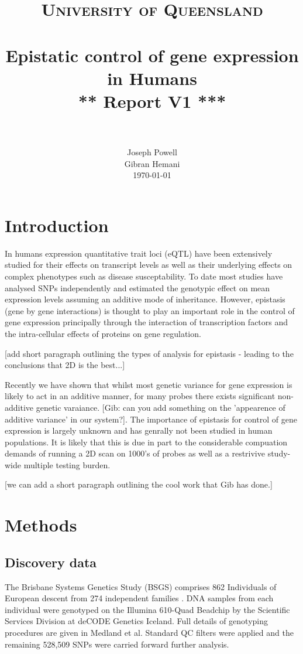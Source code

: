 \documentclass[paper=a4, fontsize=11pt]{scrartcl}	%
\title{
		\usefont{OT1}{bch}{b}{n}
		\normalfont \normalsize \textsc{University of Queensland} \\ [25pt]
		\horrule{0.5pt} \\[0.4cm]
		\huge Epistatic control of gene expression in Humans\\[0.3cm]
        \huge *** Report V1 *** \\
		\horrule{2pt} \\[0.5cm]
}
\author{
		\normalfont 								\normalsize
        Joseph Powell\\[-3pt]		\normalsize
        Gibran Hemani\\[0.2cm]		\normalsize
		\today
}
\date{}
\numberwithin{equation}{section}									%
\numberwithin{figure}{section}										%
\numberwithin{table}{section}										%
\begin{document}
\maketitle
\section{Introduction}
In humans expression quantitative trait loci (eQTL) have been extensively studied for their effects on transcript levels as well as their underlying effects on complex phenotypes such as disease susceptability. To date most studies have analysed SNPs independently and estimated the genotypic effect on mean expression levels assuming an additive mode of inheritance. However, epistasis (gene by gene interactions) is thought to play an important role in the control of gene expression principally through the interaction of transcription factors and the intra-cellular effects of proteins on gene regulation.

[add short paragraph outlining the types of analysis for epistasis - leading to the conclusions that 2D is the best...]

Recently we have shown that whilst most genetic variance for gene expression is likely to act in an additive manner, for many probes there exists significant non-additive genetic varaiance. [Gib: can you add something on the 'appearence of additive variance' in our system?]. The importance of epistasis for control of gene expression is largely unknown and has genrally not been studied in human populations. It is likely that this is due in part to the considerable compuation demands of running a 2D scan on 1000's of probes as well as a restrivive study-wide multiple testing burden.

[we can add a short paragraph outlining the cool work that Gib has done.]



\section{Methods}

\subsection{Discovery data}

The Brisbane Systems Genetics Study (BSGS) comprises 862 Individuals of European descent from 274 independent families \cite{pmid22563384}. DNA samples from each individual were genotyped on the Illumina 610-Quad Beadchip by the Scientific Services Division at deCODE Genetics Iceland. Full details of genotyping procedures are given in Medland et al. \cite{Medland2009} Standard QC filters were applied and the remaining 528,509 SNPs were carried forward further analysis. 
\end{document}
